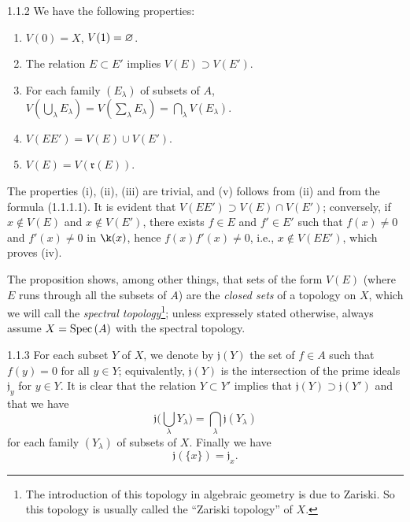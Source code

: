 \begin{envs}[Proposition]{1.1.2}
\label{env-1.1.1.2}
We have the following properties:
\begin{enumerate}[label=\rm{(\roman*)}]
  \item $V(0)=X$, $V(1)=\varnothing$.
  \item The relation $E\subset E'$ implies $V(E)\supset V(E')$.
  \item For each family $(E_\lambda)$ of subsets of $A$,
        $V(\bigcup_\lambda E_\lambda)=V(\sum_\lambda E_\lambda)
          =\bigcap_\lambda V(E_\lambda)$.
  \item $V(EE')=V(E)\cup V(E')$.
  \item $V(E)=V(\mathfrak{r}(E))$.
\end{enumerate}
\end{envs}
The properties (i), (ii), (iii) are trivial, and (v) follows from (ii) and from the
formula (1.1.1.1). It is evident that $V(EE')\supset V(E)\cap V(E')$; conversely, if
$x\not\in V(E)$ and $x\not\in V(E')$, there exists $f\in E$ and $f'\in E'$ such that
$f(x)\neq 0$ and $f'(x)\neq 0$ in $\k(x)$, hence $f(x)f'(x)\neq 0$, i.e., $x\not\in V(EE')$,
which proves (iv).

The proposition  shows, among other things, that sets of the form $V(E)$
(where $E$ runs through all the subsets of $A$) are the \emph{closed sets} of a topology on
$X$, which we will call the \emph{spectral topology}\footnote{The introduction of this
topology in algebraic geometry is due to Zariski. So this topology is usually called
the ``Zariski topology'' of $X$.}; unless expressely stated otherwise, always assume
$X={\mathop{\mathrm{Spec}}\nolimits}\,(A)$ with the spectral topology.

\begin{env}{1.1.3}
\label{env-1.1.1.3}
For each subset $Y$ of $X$, we denote by $\mathfrak{j}(Y)$ the set of $f\in A$ such that
$f(y)=0$ for all $y\in Y$; equivalently, $\mathfrak{j}(Y)$ is the intersection of the prime
ideals $\mathfrak{j}_y$ for $y\in Y$. It is clear that the relation $Y\subset Y'$ implies
that $\mathfrak{j}(Y)\supset\mathfrak{j}(Y')$ and that we have
\[
  \mathfrak{j}\bigg(\bigcup_\lambda Y_\lambda\bigg)=\bigcap_\lambda\mathfrak{j}(Y_\lambda)
  \tag{1.1.3.1}
\]
for each family $(Y_\lambda)$ of subsets of $X$. Finally we have
\[
  \mathfrak{j}(\{x\})=\mathfrak{j}_x.
  \tag{1.1.3.2}
\]
\end{env}

